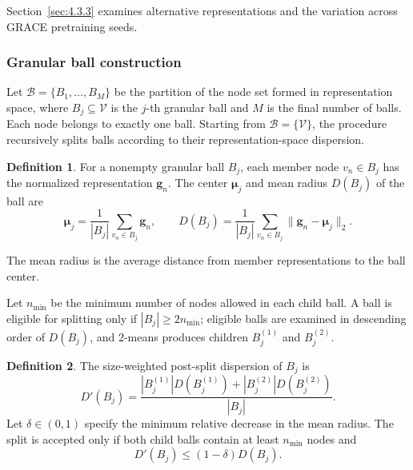 \documentclass[times,review,10pt]{elsarticle}
\theoremstyle{definition}
\newtheorem{definition}{Definition}
\theoremstyle{plain}
\begin{document}
Section~\ref{sec:4.3.3} examines alternative representations and the variation across GRACE pretraining seeds.

\subsubsection{Granular ball construction}\label{sec:3.2.2}

Let \(\mathcal B=\{B_1,\ldots,B_M\}\) be the partition of the node set formed in representation space, where \(B_j\subseteq\mathcal V\) is the \(j\)-th granular ball and \(M\) is the final number of balls. Each node belongs to exactly one ball. Starting from \(\mathcal B=\{\mathcal V\}\), the procedure recursively splits balls according to their representation-space dispersion.

\begin{definition}
For a nonempty granular ball \(B_j\), each member node \(v_n\in B_j\) has the normalized representation \(\mathbf g_n\). The center \(\boldsymbol\mu_j\) and mean radius \(D(B_j)\) of the ball are
\begin{equation}\label{eq:4}
\boldsymbol\mu_j=\frac{1}{|B_j|}\sum_{v_n\in B_j}\mathbf g_n,
\qquad D(B_j)=\frac{1}{|B_j|}\sum_{v_n\in B_j}\|\mathbf g_n-\boldsymbol\mu_j\|_2.
\end{equation}
\end{definition}

The mean radius is the average distance from member representations to the ball center.


Let \(n_{\min}\) be the minimum number of nodes allowed in each child ball. A ball is eligible for splitting only if \(|B_j|\geq2n_{\min}\); eligible balls are examined in descending order of \(D(B_j)\), and 2-means produces children \(B_j^{(1)}\) and \(B_j^{(2)}\).

\begin{definition}
The size-weighted post-split dispersion of \(B_j\) is
\begin{equation}\label{eq:5}
D'(B_j) = \frac{|B_j^{(1)}|D(B_j^{(1)}) + |B_j^{(2)}|D(B_j^{(2)})}{|B_j|}.
\end{equation}
Let \(\delta \in (0,1)\) specify the minimum relative decrease in the mean radius. The split is accepted only if both child balls contain at least \(n_{\min}\) nodes and
\begin{equation}\label{eq:6}
D'(B_j) \leq (1 - \delta)D(B_j).
\end{equation}
\end{definition}
\end{document}
